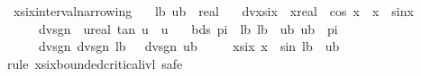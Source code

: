 \begin{isabellebody}
\isanewline
{}\isamarkupfalse%
%
\endisatagproof
{\isafoldproof}%
%
\isadelimproof
\isanewline
%
\endisadelimproof
\isanewline
{}\isamarkupfalse%
\ xsix{\isacharunderscore}{\kern0pt}interval{\isacharunderscore}{\kern0pt}narrowing{\isacharcolon}{\kern0pt}\isanewline
\ \ \ lb\ ub\ {\isacharcolon}{\kern0pt}{\isacharcolon}{\kern0pt}\ real\isanewline
\ \ \ {\isachardoublequoteopen}dvxsix\ {\isasymequiv}\ {\isacharparenleft}{\kern0pt}{\isasymlambda}x{\isacharcolon}{\kern0pt}{\isacharcolon}{\kern0pt}real{\isachardot}{\kern0pt}\ {\isacharminus}{\kern0pt}\ cos\ {\isacharparenleft}{\kern0pt}{}{\isacharslash}{\kern0pt}x{\isacharparenright}{\kern0pt}\ {\isacharslash}{\kern0pt}\ x\ {\isacharplus}{\kern0pt}\ sin{\isacharparenleft}{\kern0pt}{}{\isacharslash}{\kern0pt}x{\isacharparenright}{\kern0pt}{\isacharparenright}{\kern0pt}{\isachardoublequoteclose}\isanewline
\ \ \ \ \ {\isachardoublequoteopen}dvsgn\ {\isasymequiv}\ {\isasymlambda}u{\isacharcolon}{\kern0pt}{\isacharcolon}{\kern0pt}real{\isachardot}{\kern0pt}\ tan\ u\ {\isacharminus}{\kern0pt}\ u{\isachardoublequoteclose}\isanewline
\ \ \ bds{\isacharcolon}{\kern0pt}\ {\isachardoublequoteopen}{}{\isacharslash}{\kern0pt}{\isacharparenleft}{\kern0pt}{}{\isacharasterisk}{\kern0pt}pi{\isacharparenright}{\kern0pt}\ {\isacharless}{\kern0pt}\ lb{\isachardoublequoteclose}\ {\isachardoublequoteopen}lb\ {\isasymle}\ ub{\isachardoublequoteclose}\ {\isachardoublequoteopen}ub\ {\isacharless}{\kern0pt}\ {}{\isacharslash}{\kern0pt}pi{\isachardoublequoteclose}\isanewline
\ \ \ \ \ dvsgn{\isacharcolon}{\kern0pt}\ {\isachardoublequoteopen}dvsgn\ {\isacharparenleft}{\kern0pt}{}{\isacharslash}{\kern0pt}lb{\isacharparenright}{\kern0pt}\ {\isasymge}\ {}{\isachardoublequoteclose}\ {\isachardoublequoteopen}dvsgn\ {\isacharparenleft}{\kern0pt}{}{\isacharslash}{\kern0pt}ub{\isacharparenright}{\kern0pt}\ {\isasymle}\ {}{\isachardoublequoteclose}\isanewline
\ \ \ {\isachardoublequoteopen}xsix\ x\ {\isasymge}\ sin\ {\isacharparenleft}{\kern0pt}{}{\isacharslash}{\kern0pt}lb{\isacharparenright}{\kern0pt}\ {\isacharasterisk}{\kern0pt}\ ub{\isachardoublequoteclose}\isanewline
%
\isadelimproof
%
\endisadelimproof
%
\isatagproof
{}\isamarkupfalse%
{\isacharparenleft}{\kern0pt}rule\ xsix{\isacharunderscore}{\kern0pt}bounded{\isacharunderscore}{\kern0pt}critical{\isacharunderscore}{\kern0pt}ivl{\isacharcomma}{\kern0pt}\ safe{\isacharparenright}{\kern0pt}\isanewline

\end{isabellebody}

